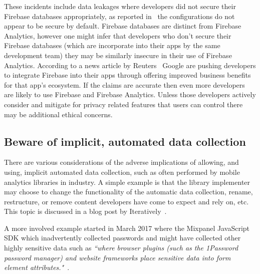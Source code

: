 These incidents include data leakages where developers did not secure their Firebase databases appropriately, as reported in~\cite{bischoff2020_firebase_missconfiguration} the configurations do not appear to be secure by default. Firebase databases are distinct from Firebase Analytics, however one might infer that developers who don't secure their Firebase databases (which are incorporate into their apps by the same development team) they may be similarly insecure in their use of Firebase Analytics. According to a news article by Reuters~\cite{dave2020_reuters_firebase_squeeze} Google are pushing developers to integrate Firebase into their apps through offering improved business benefits for that app's ecosystem. If the claims are accurate then even more developers are likely to use Firebase and Firebase Analytics. Unless those developers actively consider and mitigate for privacy related features that users can control there may be additional ethical concerns.

% 

\subsection{Beware of implicit, automated data collection}
There are various considerations of the adverse implications of allowing, and using, implicit automated data collection, such as often performed by mobile analytics libraries in industry. A simple example is that the library implementer may choose to change the functionality of the automatic data collection, rename, restructure, or remove content developers have come to expect and rely on, etc. This topic is discussed in a blog post by Iteratively~\cite{mukherjee_implicit_versus_explicit_event_tracking_hits_and_misses}.

A more involved example started in March 2017 where the Mixpanel JavaScript SDK which inadvertently collected passwords and might have collected other highly sensitive data such as \emph{``where browser plugins (such as the 1Password password manager) and website frameworks place sensitive data into form element attributes."}~\cite{mcclintok_mixpanel_update_on_autotrack_data_collection}. 


